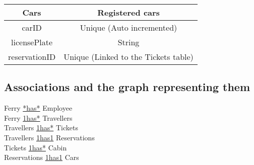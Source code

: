 \begin{table}[H]
\begin{tabular}{|c|c}
\cline{1-1}
Cars & Registered cars \\ \hline
carID & Unique (Auto incremented) \\ licensePlate & String \\ reservationID & Unique (Linked to the Tickets table) \\\hline
\end{tabular}
\end{table}

\subsection{Associations and the graph representing them}
Ferry \underline{*\phantom{x}\hspace{5ex}has\phantom{x}\hspace{5ex}*} Employee\\
Ferry \underline{1\phantom{x}\hspace{5ex}has\phantom{x}\hspace{5ex}*} Travellers\\
Travellers \underline{1\phantom{x}\hspace{5ex}has\phantom{x}\hspace{5ex}*} Tickets\\
Travellers \underline{1\phantom{x}\hspace{5ex}has\phantom{x}\hspace{5ex}1} Reservations\\
Tickets \underline{1\phantom{x}\hspace{5ex}has\phantom{x}\hspace{5ex}*} Cabin\\
Reservations \underline{1\phantom{x}\hspace{5ex}has\phantom{x}\hspace{5ex}1} Cars\\